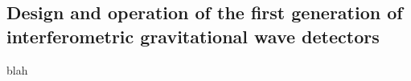 \subsection{Design and operation of the first generation of interferometric gravitational wave detectors}\label{subsec:1stgen}

blah